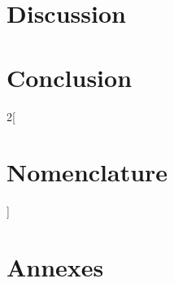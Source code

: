 \documentclass[11pt]{report}
\begin{document}
\chapter{Discussion}


\chapter{Conclusion}


\begin{multicols}{2}[\chapter{Nomenclature}]

\end{multicols}

\printbibliography

\chapter{Annexes}

\end{document}
